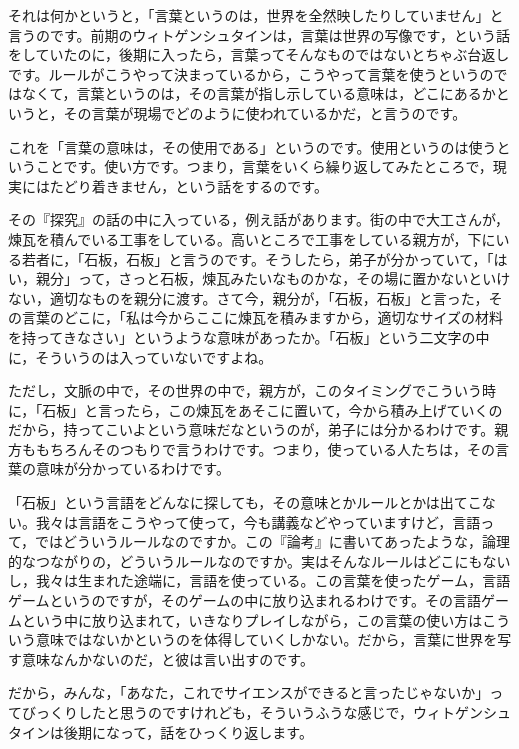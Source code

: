 \documentclass{ltjsbook}
\begin{document}
それは何かというと，「言葉というのは，世界を全然映したりしていません」と言うのです。前期のウィトゲンシュタインは，言葉は世界の写像です，という話をしていたのに，後期に入ったら，言葉ってそんなものではないとちゃぶ台返しです。ルールがこうやって決まっているから，こうやって言葉を使うというのではなくて，言葉というのは，その言葉が指し示している意味は，どこにあるかというと，その言葉が現場でどのように使われているかだ，と言うのです。

これを「言葉の意味は，その使用である」というのです。使用というのは使うということです。使い方です。つまり，言葉をいくら繰り返してみたところで，現実にはたどり着きません，という話をするのです。

その『探究』の話の中に入っている，例え話があります。街の中で大工さんが，煉瓦を積んでいる工事をしている。高いところで工事をしている親方が，下にいる若者に，「石板，石板」と言うのです。そうしたら，弟子が分かっていて，「はい，親分」って，さっと石板，煉瓦みたいなものかな，その場に置かないといけない，適切なものを親分に渡す。さて今，親分が，「石板，石板」と言った，その言葉のどこに，「私は今からここに煉瓦を積みますから，適切なサイズの材料を持ってきなさい」というような意味があったか。「石板」という二文字の中に，そういうのは入っていないですよね。

ただし，文脈の中で，その世界の中で，親方が，このタイミングでこういう時に，「石板」と言ったら，この煉瓦をあそこに置いて，今から積み上げていくのだから，持ってこいよという意味だなというのが，弟子には分かるわけです。親方ももちろんそのつもりで言うわけです。つまり，使っている人たちは，その言葉の意味が分かっているわけです。

「石板」という言語をどんなに探しても，その意味とかルールとかは出てこない。我々は言語をこうやって使って，今も講義などやっていますけど，言語って，ではどういうルールなのですか。この『論考』に書いてあったような，論理的なつながりの，どういうルールなのですか。実はそんなルールはどこにもないし，我々は生まれた途端に，言語を使っている。この言葉を使ったゲーム，言語ゲームというのですが，そのゲームの中に放り込まれるわけです。その言語ゲームという中に放り込まれて，いきなりプレイしながら，この言葉の使い方はこういう意味ではないかというのを体得していくしかない。だから，言葉に世界を写す意味なんかないのだ，と彼は言い出すのです。

だから，みんな，「あなた，これでサイエンスができると言ったじゃないか」ってびっくりしたと思うのですけれども，そういうふうな感じで，ウィトゲンシュタインは後期になって，話をひっくり返します。
\end{document}
